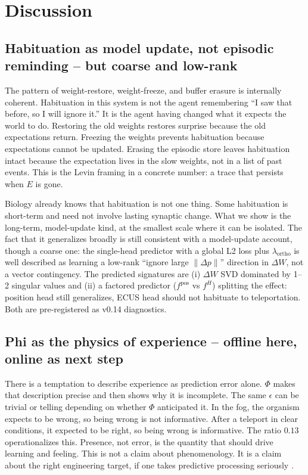 \documentclass[11pt,a4paper]{article}
\begin{document}
\section{Discussion}
\label{sec:discussion}

\subsection{Habituation as model update, not episodic reminding -- but coarse and low-rank}

The pattern of weight-restore, weight-freeze, and buffer erasure is internally coherent. Habituation in this system is not the agent remembering ``I saw that before, so I will ignore it.'' It is the agent having changed what it expects the world to do. Restoring the old weights restores surprise because the old expectations return. Freezing the weights prevents habituation because expectations cannot be updated. Erasing the episodic store leaves habituation intact because the expectation lives in the slow weights, not in a list of past events. This is the Levin framing in a concrete number: a trace that persists when $E$ is gone.

Biology already knows that habituation is not one thing. Some habituation is short-term and need not involve lasting synaptic change. What we show is the long-term, model-update kind, at the smallest scale where it can be isolated. The fact that it generalizes broadly is still consistent with a model-update account, though a coarse one: the single-head predictor with a global L2 loss plus $\lambda_{\mathrm{ortho}}$ is well described as learning a low-rank ``ignore large $\| \Delta p \|$'' direction in $\Delta W$, not a vector contingency. The predicted signatures are (i) $\Delta W$ SVD dominated by 1--2 singular values and (ii) a factored predictor ($f^{\mathrm{pos}}$ vs $f^{H}$) splitting the effect: position head still generalizes, ECUS head should not habituate to teleportation. Both are pre-registered as v0.14 diagnostics.

\subsection{Phi as the physics of experience -- offline here, online as next step}

There is a temptation to describe experience as prediction error alone. $\Phi$ makes that description precise and then shows why it is incomplete. The same $\epsilon$ can be trivial or telling depending on whether $\Phi$ anticipated it. In the fog, the organism expects to be wrong, so being wrong is not informative. After a teleport in clear conditions, it expected to be right, so being wrong is informative. The ratio $0.13$ operationalizes this. Presence, not error, is the quantity that should drive learning and feeling. This is not a claim about phenomenology. It is a claim about the right engineering target, if one takes predictive processing seriously \cite{friston2010, laukkonen2025}.
\end{document}
